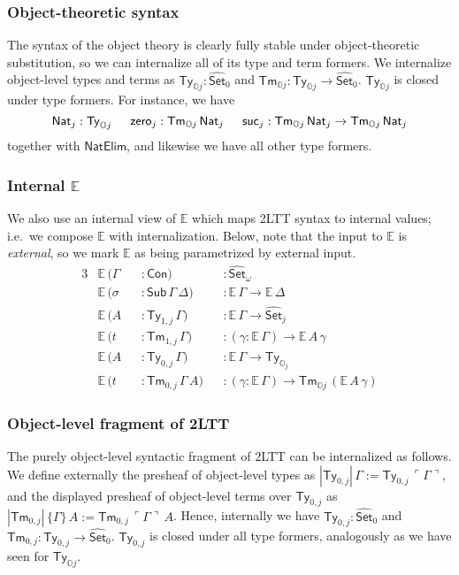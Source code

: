 \documentclass[acmsmall]{acmart}
\newcommand{\msf}[1]{\mathsf{#1}}
\newcommand{\mbb}[1]{\mathbb{#1}}
\newcommand{\wh}[1]{\widehat{#1}}
\newcommand{\NatElim}{\msf{NatElim}}
\newcommand{\mbbo}{\mbb{O}}
\newcommand{\Con}{\msf{Con}}
\newcommand{\Sub}{\msf{Sub}}
\newcommand{\Ty}{\msf{Ty}}
\newcommand{\Tm}{\msf{Tm}}
\newcommand{\Nat}{\msf{Nat}}
\newcommand{\zero}{\msf{zero}}
\newcommand{\suc}{\msf{suc}}
\newcommand{\Set}{\mathsf{Set}}
\newcommand{\emb}[1]{\ulcorner#1\urcorner}
\newcommand{\ev}{\mbb{E}}
\theoremstyle{remark}
\newcommand{\whset}{\wh{\Set}}
\begin{document}
\subsubsection{Object-theoretic syntax} The syntax of the object theory is clearly
fully stable under object-theoretic substitution, so we can internalize all of
its type and term formers. We internalize object-level types and terms as
$\Ty_{\mbbo j} : \whset_0$ and $\Tm_{\mbbo j} : \Ty_{\mbbo j} \to
\whset_0$. $\Ty_{\mbbo j}$ is closed under type formers. For instance, we have
\[ \Nat_j : \Ty_{\mbbo j}\hspace{1.5em}\zero_j : \Tm_{\mbbo j}\,\Nat_j\hspace{1.5em}
    \suc_j : \Tm_{\mbbo j}\,\Nat_j \to \Tm_{\mbbo j}\,\Nat_j \]
together with $\NatElim$, and likewise we have all other type formers.
\subsubsection{Internal $\ev$} We also use an internal view of
$\ev$ which maps 2LTT syntax to internal values; i.e.\ we compose $\ev$ with
internalization. Below, note that the input to $\ev$ is \emph{external}, so we
mark $\ev$ as being parametrized by external input.
\begin{alignat*}{3}
  &\ev\,(\Gamma &&: \Con)                      &&: \whset_\omega \\
  &\ev\,(\sigma &&: \Sub\,\Gamma\,\Delta)      &&: \ev\,\Gamma \to \ev\,\Delta \\
  &\ev\,(A      &&: \Ty_{1,j}\,\Gamma)          &&: \ev\,\Gamma \to \whset_j\\
  &\ev\,(t      &&: \Tm_{1,j}\,\Gamma)          &&: (\gamma : \ev\,\Gamma) \to \ev\,A\,\gamma\\
  &\ev\,(A      &&: \Ty_{0,j}\,\Gamma)          &&: \ev\,\Gamma \to \Ty_{\mbbo_j}\\
  &\ev\,(t      &&: \Tm_{0,j}\,\Gamma\,A)       &&: (\gamma : \ev\,\Gamma) \to \Tm_{\mbbo j}\,(\ev\,A\,\gamma)
\end{alignat*}
\subsubsection{Object-level fragment of 2LTT}
The purely object-level syntactic fragment of 2LTT can be internalized as
follows. We define externally the presheaf of object-level types as
$|\Ty_{0,j}|\,\Gamma := \Ty_{0,j}\,\emb{\Gamma}$, and the displayed presheaf of
object-level terms over $\Ty_{0,j}$ as $|\Tm_{0,j}|\,\{\Gamma\}\,A :=
\Tm_{0,j}\,\emb{\Gamma}\,A$. Hence, internally we have $\Ty_{0,j} : \whset_0$ and
$\Tm_{0,j} : \Ty_{0,j} \to \whset_0$. $\Ty_{0,j}$ is closed under all type formers,
analogously as we have seen for $\Ty_{\mbbo j}$.
\end{document}
